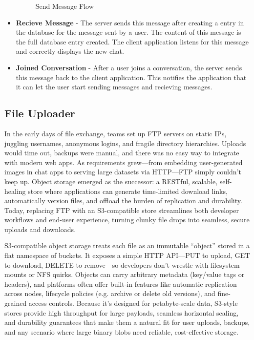 \begin{itemize}
\begin{figure}[H]
        \caption*{Send Message Flow}
        \label{fig:send-message-flow}
    \end{figure}
    \item \textbf{Recieve Message} - The server sends this message after creating a entry in the database for the message sent by a user. The content of this message is the full database entry created. The client application listens for this message and correctly displays the new chat.
    \item \textbf{Joined Conversation} - After a user joins a conversation, the server sends this message back to the client application. This notifies the application that it can let the user start sending messages and recieving messages.
\end{itemize}

\subsection{File Uploader}
In the early days of file exchange, teams set up FTP servers on static IPs, juggling usernames, anonymous logins, and fragile directory hierarchies. Uploads would time out, backups were manual, and there was no easy way to integrate with modern web apps. As requirements grew—from embedding user-generated images in chat apps to serving large datasets via HTTP—FTP simply couldn’t keep up. Object storage emerged as the successor: a RESTful, scalable, self-healing store where applications can generate time-limited download links, automatically version files, and offload the burden of replication and durability. Today, replacing FTP with an S3-compatible store streamlines both developer workflows and end-user experience, turning clunky file drops into seamless, secure uploads and downloads.

S3-compatible object storage treats each file as an immutable “object” stored in a flat namespace of buckets. It exposes a simple HTTP API—PUT to upload, GET to download, DELETE to remove—so developers don’t wrestle with filesystem mounts or NFS quirks. Objects can carry arbitrary metadata (key/value tags or headers), and platforms often offer built-in features like automatic replication across nodes, lifecycle policies (e.g. archive or delete old versions), and fine-grained access controls. Because it’s designed for petabyte-scale data, S3-style stores provide high throughput for large payloads, seamless horizontal scaling, and durability guarantees that make them a natural fit for user uploads, backups, and any scenario where large binary blobs need reliable, cost-effective storage.

